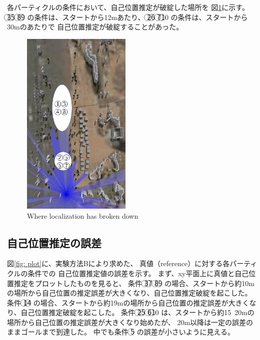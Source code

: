 \documentclass{jarticle}
\begin{document}
各パーティクルの条件において、自己位置推定が破綻した場所を
図\ref{fig: 失敗箇所}に示す。
\textcircled{\scriptsize 3}\textcircled{\scriptsize 5}\noindent
\textcircled{\scriptsize 8}\textcircled{\scriptsize 9}\noindent
の条件は、スタートから12mあたり、
\textcircled{\scriptsize 2}\textcircled{\scriptsize 6}\noindent
\textcircled{\scriptsize 7}\textcircled{\scriptsize 10}\noindent
の条件は、スタートから30mのあたりで
自己位置推定が破綻することがあった。

\begin{figure}[htbp]
  \centering
   \includegraphics[height=90mm]{fig/failure_location.png}
   \vspace*{-4mm}
   \caption{Where localization has broken down}
   \label{fig: 失敗箇所}
\end{figure}

\subsection{自己位置推定の誤差}

図\ref{fig: plot}に、実験方法Bにより求めた、
真値（reference）に対する各パーティクルの条件での
自己位置推定値の誤差を示す。
まず、xy平面上に真値と自己位置推定をプロットしたものを見ると、
条件
\textcircled{\scriptsize 3}\textcircled{\scriptsize 7}\noindent
\textcircled{\scriptsize 8}\textcircled{\scriptsize 9}\noindent
の場合、スタートから約10mの場所から自己位置の推定誤差が大きくなり、自己位置推定破綻を起こした。
条件
\textcircled{\scriptsize 1}\textcircled{\scriptsize 4}\noindent
の場合、スタートから約19mの場所から自己位置の推定誤差が大きくなり、自己位置推定破綻を起こした。
条件
\textcircled{\scriptsize 2}\textcircled{\scriptsize 5}\noindent
\textcircled{\scriptsize 6}\textcircled{\scriptsize 10}\noindent
は、スタートから約15~20mの場所から自己位置の推定誤差が大きくなり始めたが、
20m以降は一定の誤差のままゴールまで到達した。
中でも条件
\textcircled{\scriptsize 5}\noindent
の誤差が小さいように見える。
\end{document}
